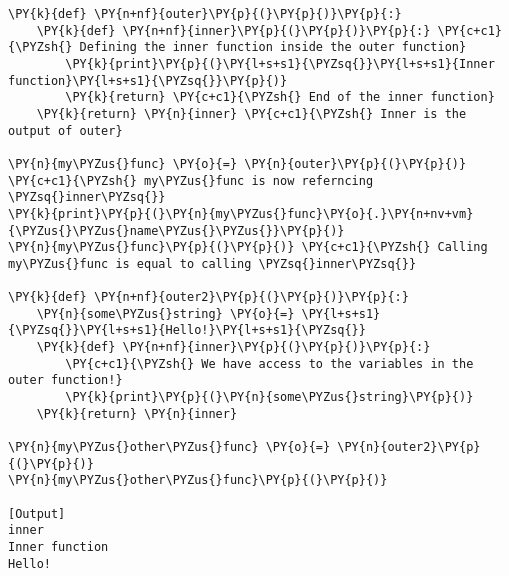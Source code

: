\begin{Verbatim}[label=\makebox{\url{https://github.com/lucabaldini/cmepda/tree/master/slides/latex/snippets/inner\_outer.py}},commandchars=\\\{\}]
\PY{k}{def} \PY{n+nf}{outer}\PY{p}{(}\PY{p}{)}\PY{p}{:}   
    \PY{k}{def} \PY{n+nf}{inner}\PY{p}{(}\PY{p}{)}\PY{p}{:} \PY{c+c1}{\PYZsh{} Defining the inner function inside the outer function}
        \PY{k}{print}\PY{p}{(}\PY{l+s+s1}{\PYZsq{}}\PY{l+s+s1}{Inner function}\PY{l+s+s1}{\PYZsq{}}\PY{p}{)}
        \PY{k}{return} \PY{c+c1}{\PYZsh{} End of the inner function}
    \PY{k}{return} \PY{n}{inner} \PY{c+c1}{\PYZsh{} Inner is the output of outer}
    
\PY{n}{my\PYZus{}func} \PY{o}{=} \PY{n}{outer}\PY{p}{(}\PY{p}{)} \PY{c+c1}{\PYZsh{} my\PYZus{}func is now referncing \PYZsq{}inner\PYZsq{}}
\PY{k}{print}\PY{p}{(}\PY{n}{my\PYZus{}func}\PY{o}{.}\PY{n+nv+vm}{\PYZus{}\PYZus{}name\PYZus{}\PYZus{}}\PY{p}{)}
\PY{n}{my\PYZus{}func}\PY{p}{(}\PY{p}{)} \PY{c+c1}{\PYZsh{} Calling my\PYZus{}func is equal to calling \PYZsq{}inner\PYZsq{}}

\PY{k}{def} \PY{n+nf}{outer2}\PY{p}{(}\PY{p}{)}\PY{p}{:}
    \PY{n}{some\PYZus{}string} \PY{o}{=} \PY{l+s+s1}{\PYZsq{}}\PY{l+s+s1}{Hello!}\PY{l+s+s1}{\PYZsq{}}
    \PY{k}{def} \PY{n+nf}{inner}\PY{p}{(}\PY{p}{)}\PY{p}{:}
        \PY{c+c1}{\PYZsh{} We have access to the variables in the outer function!}
        \PY{k}{print}\PY{p}{(}\PY{n}{some\PYZus{}string}\PY{p}{)}
    \PY{k}{return} \PY{n}{inner}
    
\PY{n}{my\PYZus{}other\PYZus{}func} \PY{o}{=} \PY{n}{outer2}\PY{p}{(}\PY{p}{)}
\PY{n}{my\PYZus{}other\PYZus{}func}\PY{p}{(}\PY{p}{)}

[Output]
inner
Inner function
Hello!
\end{Verbatim}